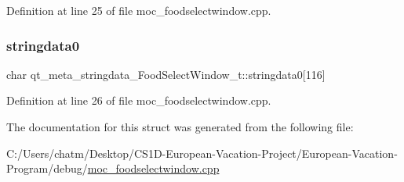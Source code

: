 Definition at line 25 of file moc\+\_\+foodselectwindow.\+cpp.

\mbox{\label{structqt__meta__stringdata___food_select_window__t_a9169177486e14663a4195d726847e397}} 
\subsubsection{\texorpdfstring{stringdata0}{stringdata0}}
{\footnotesize\ttfamily char qt\+\_\+meta\+\_\+stringdata\+\_\+\+Food\+Select\+Window\+\_\+t\+::stringdata0\mbox{[}116\mbox{]}}



Definition at line 26 of file moc\+\_\+foodselectwindow.\+cpp.



The documentation for this struct was generated from the following file\+:\begin{DoxyCompactItemize}
\item 
C\+:/\+Users/chatm/\+Desktop/\+C\+S1\+D-\/\+European-\/\+Vacation-\/\+Project/\+European-\/\+Vacation-\/\+Program/debug/\mbox{\hyperlink{moc__foodselectwindow_8cpp}{moc\+\_\+foodselectwindow.\+cpp}}\end{DoxyCompactItemize}
